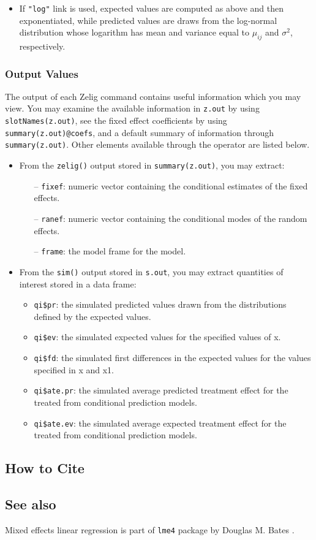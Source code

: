 \begin{itemize}
\item If {\tt "log"} link is used, expected values are computed as above and then exponentiated, while predicted values are draws from the log-normal distribution whose logarithm has mean and variance equal to $\mu_{ij}$ and $\sigma^2$, respectively.

\end{itemize}

\subsubsection{Output Values}

The output of each Zelig command contains useful information which you may view. You may examine the available information in {\tt z.out} by using {\tt slotNames(z.out)}, see the fixed effect coefficients by using {\tt summary(z.out)@coefs}, and a default summary of information through {\tt summary(z.out)}. Other elements available through the {\tt \@} operator are listed below.
\begin{itemize}
\item From the {\tt zelig()} output stored in {\tt summary(z.out)}, you may extract:
\begin{itemize}
\item[--] {\tt fixef}: numeric vector containing the conditional estimates of the fixed effects.
\item[--] {\tt ranef}: numeric vector containing the conditional modes of the random effects.
\item[--] {\tt frame}: the model frame for the model.
\end{itemize}
\item From the {\tt sim()} output stored in {\tt s.out}, you may extract quantities of interest stored in a data frame:
\begin{itemize}
\item {\tt qi\$pr}: the simulated predicted values drawn from the distributions defined by the expected values.
\item {\tt qi\$ev}: the simulated expected values for the specified values of x.
\item {\tt qi\$fd}: the simulated first differences in the expected values for the values specified in x and x1.
\item {\tt qi\$ate.pr}: the simulated average predicted treatment effect for the treated from conditional prediction models.
\item {\tt qi\$ate.ev}: the simulated average expected treatment effect for the treated from conditional prediction models.
\end{itemize}
\end{itemize}




\subsection* {How to Cite}




\subsection* {See also}
Mixed effects linear regression is part of {\tt lme4} package by Douglas M. Bates \citep{Bates07}.
